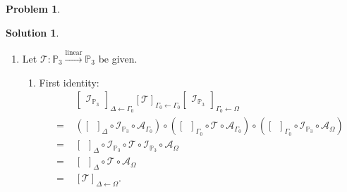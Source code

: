 \documentclass{article}
\theoremstyle{definition}
\newtheorem*{prob*}{Problem}
\newtheorem*{sln*}{Solution}
\newcommand{\lin}{\overset{\text{linear}}{\longrightarrow}}
\newcommand{\T}{\mathcal{T}}
\begin{document}
\begin{prob*}
\begin{sln*}
\begin{enumerate}
			\item Let $\T : \mathbb{P}_3 \lin \mathbb{P}_3$ be given. 
			\begin{enumerate}
				\item First identity:
				\begin{align*}
				&\begin{bmatrix}
				\mathcal{I}_{\mathbb{P}_3}
				\end{bmatrix}_{\Delta \leftarrow \Gamma_0} [\mathcal{T}]_{\Gamma_0 \leftarrow \Gamma_0} 
				\begin{bmatrix}
				\mathcal{I}_{\mathbb{P}_3}
				\end{bmatrix}_{\Gamma_0 \leftarrow \Omega}	\\
				=\,\,
				&\left([\,\,\,]_{\Delta}\circ\mathcal{I}_{\mathbb{P}_3} \circ \mathcal{A}_{\Gamma_0}\right) \circ \left([\,\,\,]_{\Gamma_0}\circ \T \circ \mathcal{A}_{\Gamma_0}\right) \circ \left([\,\,\,]_{\Gamma_0} \circ \mathcal{I}_{\mathbb{P}_3} \circ \mathcal{A}_{\Omega}\right) \\
				=\,\,
				&[\,\,\,]_\Delta \circ \mathcal{I}_{\mathbb{P}_3}\circ \T \circ \mathcal{I}_{\mathbb{P}_3}\circ \mathcal{A}_\Omega\\
				=\,\,
				&[\,\,\,]_\Delta \circ  \T \circ \mathcal{A}_\Omega\\
				=\,\,
				&[\T]_{\Delta\leftarrow\Omega}.
				\end{align*}
				

\end{enumerate}
\end{enumerate}
\end{sln*}
\end{prob*}
\end{document}
